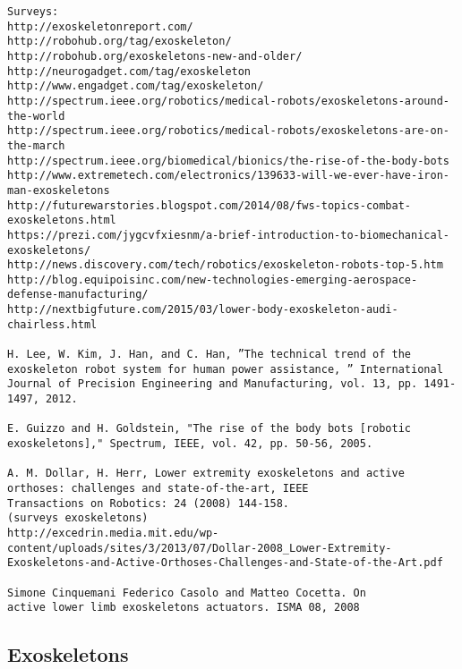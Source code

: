 \documentclass[letterpaper,12pt,fullpage]{article}
\begin{document}
\begin{verbatim}
Surveys:
http://exoskeletonreport.com/
http://robohub.org/tag/exoskeleton/
http://robohub.org/exoskeletons-new-and-older/
http://neurogadget.com/tag/exoskeleton
http://www.engadget.com/tag/exoskeleton/
http://spectrum.ieee.org/robotics/medical-robots/exoskeletons-around-the-world
http://spectrum.ieee.org/robotics/medical-robots/exoskeletons-are-on-the-march
http://spectrum.ieee.org/biomedical/bionics/the-rise-of-the-body-bots
http://www.extremetech.com/electronics/139633-will-we-ever-have-iron-man-exoskeletons
http://futurewarstories.blogspot.com/2014/08/fws-topics-combat-exoskeletons.html
https://prezi.com/jygcvfxiesnm/a-brief-introduction-to-biomechanical-exoskeletons/
http://news.discovery.com/tech/robotics/exoskeleton-robots-top-5.htm
http://blog.equipoisinc.com/new-technologies-emerging-aerospace-defense-manufacturing/
http://nextbigfuture.com/2015/03/lower-body-exoskeleton-audi-chairless.html

H. Lee, W. Kim, J. Han, and C. Han, ”The technical trend of the
exoskeleton robot system for human power assistance, ” International
Journal of Precision Engineering and Manufacturing, vol. 13, pp. 1491-
1497, 2012.

E. Guizzo and H. Goldstein, "The rise of the body bots [robotic
exoskeletons]," Spectrum, IEEE, vol. 42, pp. 50-56, 2005.

A. M. Dollar, H. Herr, Lower extremity exoskeletons and active
orthoses: challenges and state-of-the-art, IEEE
Transactions on Robotics: 24 (2008) 144-158.
(surveys exoskeletons)
http://excedrin.media.mit.edu/wp-content/uploads/sites/3/2013/07/Dollar-2008_Lower-Extremity-Exoskeletons-and-Active-Orthoses-Challenges-and-State-of-the-Art.pdf

Simone Cinquemani Federico Casolo and Matteo Cocetta. On
active lower limb exoskeletons actuators. ISMA 08, 2008
\end{verbatim}

\subsection{Exoskeletons}
\end{document}
